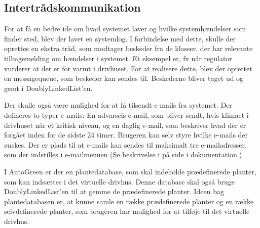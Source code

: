 \subsection{Intertrådskommunikation}

For at få en bedre ide om hvad systemet laver og hvilke systemhændelser som finder sted, blev der lavet en systemlog. 
I forbindelse med dette, skulle der oprettes en ekstra tråd, som modtager beskeder fra de klasser, der har relevante tilbagemelding om hændelser i systemet. Et eksempel er, fx når regulator vurderer at der er for varmt i drivhuset. For at realisere dette, blev der oprettet en messagequeue, som beskeder kan sendes til. Beskederne bliver taget ud og gemt i DoublyLinkedList'en.

Der skulle også være mulighed for at få tilsendt e-mails fra systemet. Der defineres to typer e-mails: En advarsels e-mail, som bliver sendt, hvis klimaet i drivhuset når et kritisk niveau, og en daglig e-mail, som beskriver hvad der er forgået inden for de sidste 24 timer. Brugeren kan selv styre hvilke e-mails der ønskes. Der er plads til at e-mails kan sendes til maksimalt tre e-mailadresser, som der indstilles i e-mailmenuen (Se beskrivelse i  på side \pageref{P-sec:mailmenu} i dokumentation.)

I AutoGreen er der en plantedatabase, som skal indeholde prædefinerede planter, som kan indsættes i det virtuelle drivhus. Denne database skal også bruge DoublyLinkedList'en til at gemme de prædefinerede planter. Ideen bag plantedatabasen er, at kunne samle en række prædefinerede planter og en række selvdefinerede planter, som brugeren har mulighed for at tilføje til det virtuelle drivhus. 

\clearpage